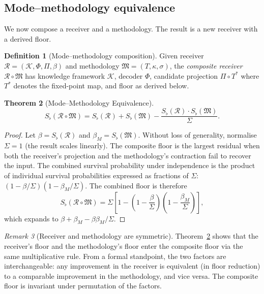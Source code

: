\documentclass[11pt,twocolumn,a4paper]{article}
\newtheorem{theorem}{Theorem}[section]
\theoremstyle{definition}
\newtheorem{definition}[theorem]{Definition}
\theoremstyle{remark}
\newtheorem{remark}[theorem]{Remark}
\newcommand{\Knowl}{\mathcal{K}}
\newcommand{\Method}{\mathfrak{M}}
\newcommand{\receiver}{\mathcal{R}}
\newcommand{\Sigmax}{\Sigma}
\newcommand{\Sfloor}{S_{\flat}}
\newcommand{\catpow}{\kappa}
\newcommand{\disp}{\sigma}
\begin{document}
\subsection{Mode--methodology equivalence}

We now compose a receiver and a methodology. The result is a new receiver with a derived floor.

\begin{definition}[Mode--methodology composition]
\label{def:mode-method}
Given receiver $\receiver = (\Knowl, \Phi, \Pi, \beta)$ and methodology $\Method = (T, \catpow, \disp)$, the \emph{composite receiver} $\receiver \circ \Method$ has knowledge framework $\Knowl$, decoder $\Phi$, candidate projection $\Pi \circ T^*$ where $T^*$ denotes the fixed-point map, and floor as derived below.
\end{definition}

\begin{theorem}[Mode--Methodology Equivalence]
\label{thm:mme}
\[
\Sfloor(\receiver \circ \Method) = \Sfloor(\receiver) + \Sfloor(\Method) - \frac{\Sfloor(\receiver) \cdot \Sfloor(\Method)}{\Sigmax}.
\]
\end{theorem}

\begin{proof}
Let $\beta = \Sfloor(\receiver)$ and $\beta_M = \Sfloor(\Method)$. Without loss of generality, normalise $\Sigmax = 1$ (the result scales linearly). The composite floor is the largest residual when both the receiver's projection and the methodology's contraction fail to recover the input. The combined survival probability under independence is the product of individual survival probabilities expressed as fractions of $\Sigmax$: $(1 - \beta/\Sigmax)(1 - \beta_M/\Sigmax)$. The combined floor is therefore
\[
\Sfloor(\receiver \circ \Method) = \Sigmax \left[1 - \left(1 - \frac{\beta}{\Sigmax}\right)\left(1 - \frac{\beta_M}{\Sigmax}\right)\right],
\]
which expands to $\beta + \beta_M - \beta\beta_M/\Sigmax$.
\end{proof}

\begin{remark}[Receiver and methodology are symmetric]
Theorem~\ref{thm:mme} shows that the receiver's floor and the methodology's floor enter the composite floor via the same multiplicative rule. From a formal standpoint, the two factors are interchangeable: any improvement in the receiver is equivalent (in floor reduction) to a comparable improvement in the methodology, and vice versa. The composite floor is invariant under permutation of the factors.
\end{remark}
\end{document}
